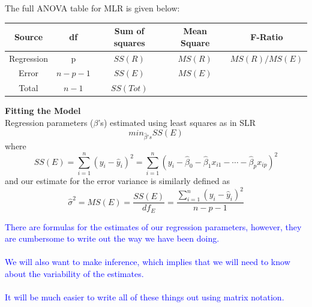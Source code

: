 The full ANOVA table for MLR is given below:\\
\begin{tabular}{|c|c|c|c|c|} \hline
Source & df & Sum of squares & Mean Square & F-Ratio \\ \hline
Regression &  p &$SS(R)$ & $MS(R)$ & $MS(R)/MS(E)$ \\
Error & $n-p-1$ & $SS(E)$ &$MS(E)$ &  \\
Total & $n-1$ & $SS(Tot)$ & &  \\ \hline
\end{tabular}

\newpage

\Large\textbf{Fitting the Model}\large\\
Regression parameters ($\beta$'s) estimated using least squares as in SLR
$$ min_{\hat{\beta}'s} SS(E)$$
where 
$$SS(E) = \sum_{i=1}^n (y_i-\hat{y}_i)^2=\sum_{i=1}^n (y_i - \hat{\beta}_0 - \hat{\beta}_1 x_{i1} - \cdots - \hat{\beta}_p x_{ip})^2$$
and our estimate for the error variance is similarly defined as
$$\hat\sigma^2 = MS(E)=\frac{SS(E)}{df_E}=\frac{\sum_{i=1}^n (y_i-\hat{y}_i)^2}{n-p-1}$$


\textcolor{blue}{There are formulas for the estimates of our regression parameters, however, they are cumbersome to write out the way we have been doing. \\~\\
We will also want to make inference, which implies that we will need to know about the variability of the estimates. \\~\\
It will be much easier to write all of these things out using matrix notation.}\\~\\


